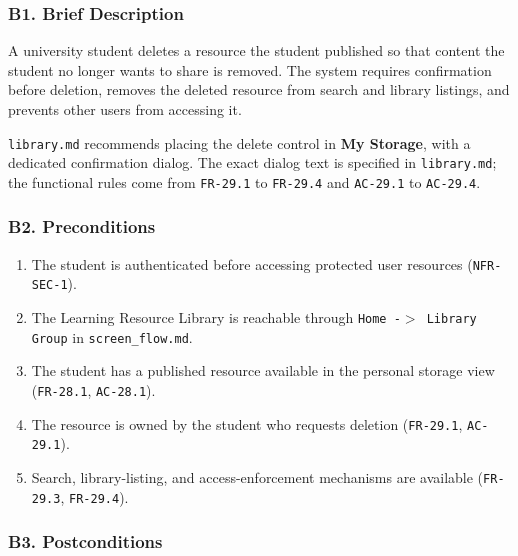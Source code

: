 \documentclass[12pt]{article}
\begin{document}
\hypertarget{sec:b1-brief-description}{}
\subsubsection*{B1. Brief Description}
\par\medskip

A university student deletes a resource the student published so that content the student no longer wants to share is removed. The system requires confirmation before deletion, removes the deleted resource from search and library listings, and prevents other users from accessing it.
\par\medskip

\texttt{library.md} recommends placing the delete control in \textbf{My Storage}, with a dedicated confirmation dialog. The exact dialog text is specified in \texttt{library.md}; the functional rules come from \texttt{FR-29.1} to \texttt{FR-29.4} and \texttt{AC-29.1} to \texttt{AC-29.4}.
\par\medskip

\hypertarget{sec:b2-preconditions}{}
\subsubsection*{B2. Preconditions}
\par\medskip

\begin{enumerate}
\item The student is authenticated before accessing protected user resources (\texttt{NFR-SEC-1}).
\item The Learning Resource Library is reachable through \texttt{Home -$>$ Library Group} in \texttt{screen\_flow.md}.
\item The student has a published resource available in the personal storage view (\texttt{FR-28.1}, \texttt{AC-28.1}).
\item The resource is owned by the student who requests deletion (\texttt{FR-29.1}, \texttt{AC-29.1}).
\item Search, library-listing, and access-enforcement mechanisms are available (\texttt{FR-29.3}, \texttt{FR-29.4}).
\end{enumerate}
\par\medskip

\hypertarget{sec:b3-postconditions}{}
\subsubsection*{B3. Postconditions}
\par\medskip
\end{document}
